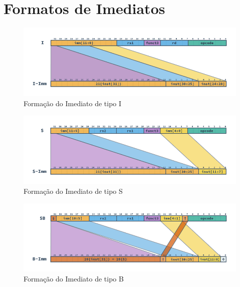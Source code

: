 

\section{Formatos de Imediatos}

\begin{figure}[H]
\centering
    \includegraphics[width=1\linewidth]{../images/RV_I_Imm.png}
    \caption{Formação do Imediato de tipo I
        }\label{fig:riscv_i_imm}
\end{figure}

\begin{figure}[H]
\centering
    \includegraphics[width=1\linewidth]{../images/RV_S_Imm.png}
    \caption{Formação do Imediato de tipo S
        }\label{fig:riscv_s_imm}
\end{figure}

\begin{figure}[H]
\centering
    \includegraphics[width=1\linewidth]{../images/RV_B_Imm.png}
    \caption{Formação do Imediato de tipo B
        }\label{fig:riscv_b_imm}
\end{figure}

